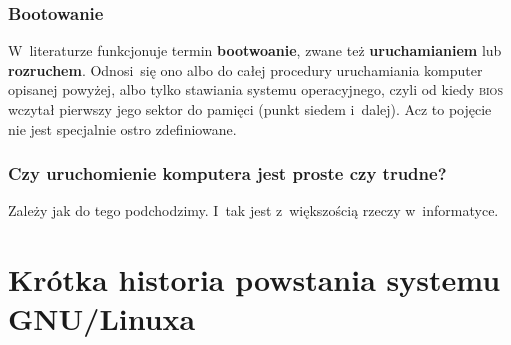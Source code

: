 \documentclass[10pt,t]{beamer}
\begin{document}
\begin{frame}
  \frametitle{Bootowanie}


  W~literaturze funkcjonuje termin \textbf{bootwoanie}, zwane też
  \textbf{uruchamianiem} lub \textbf{rozruchem}. Odnosi~się ono albo do
  całej procedury uruchamiania komputer opisanej powyżej, albo tylko
  stawiania systemu operacyjnego, czyli od kiedy \textsc{bios} wczytał
  pierwszy jego sektor do pamięci (punkt siedem i~dalej). Acz to pojęcie
  nie jest specjalnie ostro zdefiniowane.

\end{frame}





\begin{frame}
  \frametitle{Czy uruchomienie komputera jest proste czy trudne?}


  Zależy jak do tego podchodzimy. I~tak jest z~większością rzeczy
  w~informatyce.

\end{frame}










\section{Krótka historia powstania systemu GNU/Linuxa}










\end{document}
